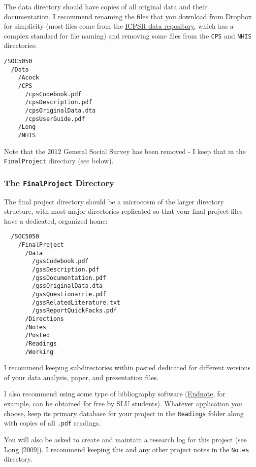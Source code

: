 \documentclass[]{book}
\begin{document}
The data directory should have copies of all original data and their
documentation. I recommend renaming the files that you download from
Dropbox for simplicity (most files come from the
\href{http://www.icpsr.umich.edu/icpsrweb/}{ICPSR data repository},
which has a complex standard for file naming) and removing some files
from the \texttt{CPS} and \texttt{NHIS} directories:

\begin{verbatim}
/SOC5050
  /Data
    /Acock
    /CPS
      /cpsCodebook.pdf
      /cpsDescription.pdf
      /cpsOriginalData.dta
      /cpsUserGuide.pdf
    /Long
    /NHIS
\end{verbatim}

Note that the 2012 General Social Survey has been removed - I keep that
in the \texttt{FinalProject} directory (see below).

\subsubsection{\texorpdfstring{The \texttt{FinalProject}
Directory}{The FinalProject Directory}}\label{the-finalproject-directory}

The final project directory should be a microcosm of the larger
directory structure, with most major directories replicated so that your
final project files have a dedicated, organized home:

\begin{verbatim}
  /SOC5050
    /FinalProject
      /Data
        /gssCodebook.pdf
        /gssDescription.pdf
        /gssDocumentation.pdf
        /gssOriginalData.dta
        /gssQuestionarrie.pdf
        /gssRelatedLiterature.txt
        /gssReportQuickFacks.pdf      
      /Directions
      /Notes
      /Posted
      /Readings
      /Working
\end{verbatim}

I recommend keeping subdirectories within posted dedicated for different
versions of your data analysis, paper, and presentation files.

I also recommend using some type of bibliography software
(\href{http://endnote.com}{Endnote}, for example, can be obtained for
free by SLU students). Whatever application you choose, keep its primary
database for your project in the \texttt{Readings} folder along with
copies of all \texttt{.pdf} readings.

You will also be asked to create and maintain a research log for this
project (see Long {[}2009{]}). I recommend keeping this and any other
project notes in the \texttt{Notes} directory.
\end{document}
